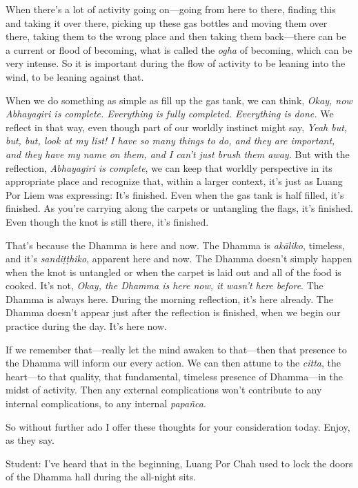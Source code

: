 When there's a lot of activity going on---going from here to there, 
finding this and taking it over there, picking up these gas bottles and 
moving them over there, taking them to the wrong place and then taking 
them back---there can be a current or flood of becoming, what is called 
the \emph{ogha} of becoming, which can be very intense. So it is 
important during the flow of activity to be leaning into the wind, to 
be leaning against that.

When we do something as simple as fill up the gas tank, we can think, 
\emph{Okay, now Abhayagiri is complete. Everything is fully completed. 
Everything is done.} We reflect in that way, even though part of our 
worldly instinct might say, \emph{Yeah but, but, but, look at my list! 
I have so many things to do, and they are important, and they have my 
name on them, and I can't just brush them away.} But with the 
reflection, \emph{Abhayagiri is complete}, we can keep that worldly 
perspective in its appropriate place and recognize that, within a 
larger context, it's just as Luang Por Liem was expressing: It's 
finished. Even when the gas tank is half filled, it's finished. As 
you're carrying along the carpets or untangling the flags, it's 
finished. Even though the knot is still there, it's finished.

That's because the Dhamma is here and now. The Dhamma is 
\emph{akāliko}, timeless, and it's \emph{sandiṭṭhiko}, apparent 
here and now. The Dhamma doesn't simply happen when the knot is 
untangled or when the carpet is laid out and all of the food is cooked. 
It's not, \emph{Okay, the Dhamma is here now, it wasn't here before}. 
The Dhamma is always here. During the morning reflection, it's here 
already. The Dhamma doesn't appear just after the reflection is 
finished, when we begin our practice during the day. It's here now.

If we remember that---really let the mind awaken to that---then that 
presence to the Dhamma will inform our every action. We can then attune 
to the \emph{citta}, the heart---to that quality, that fundamental, 
timeless presence of Dhamma---in the midst of activity. Then any 
external complications won't contribute to any internal complications, 
to any internal \emph{papañca}.

So without further ado I offer these thoughts for your consideration 
today. Enjoy, as they say.


Student: I've heard that in the beginning, Luang Por Chah used to lock 
the doors of the Dhamma hall during the all-night sits.

